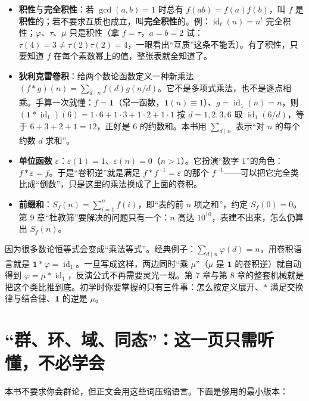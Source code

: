\documentclass[UTF8,a4paper,11pt,twoside,openright,fontset=fandol]{ctexbook}
\theoremstyle{definition}
\newcommand{\eps}{\varepsilon}
\newcommand{\one}{\mathbf 1}
\newcommand{\id}{\operatorname{id}}
\begin{document}
\begin{itemize}
\item \textbf{积性}与\textbf{完全积性}：若 $\gcd(a,b)=1$ 时总有 $f(ab)=f(a)f(b)$，叫 $f$ 是\textbf{积性}的；若不要求互质也成立，叫\textbf{完全积性}的。例：$\id_t(n)=n^t$ 完全积性；$\varphi$、$\tau$、$\mu$ 只是积性（拿 $f=\tau$，$a=b=2$ 试：$\tau(4)=3\ne\tau(2)\tau(2)=4$，一眼看出“互质”这条不能丢）。有了积性，只要知道 $f$ 在每个素数幂上的值，整张表就全知道了。
\item \textbf{狄利克雷卷积}：给两个数论函数定义一种新乘法
$(f*g)(n)=\sum_{d\mid n}f(d)g(n/d)$。它不是多项式乘法，也不是逐点相乘。手算一次就懂：$f=\one$（常一函数，$\one(n)\equiv1$）、$g=\id_1(n)=n$，则 $(\one*\id_1)(6)=1\cdot6+1\cdot3+1\cdot2+1\cdot1$ 按 $d=1,2,3,6$ 取 $\id_1(6/d)$，等于 $6+3+2+1=12$，正好是 $6$ 的约数和。本书用 $\sum_{d\mid n}$ 表示“对 $n$ 的每个约数 $d$ 求和”。
\item \textbf{单位函数} $\eps$：$\eps(1)=1$、$\eps(n)=0$（$n>1$）。它扮演“数字 $1$”的角色：$f*\eps=f$。于是“卷积逆”就是满足 $f*f^{-1}=\eps$ 的那个 $f^{-1}$——可以把它完全类比成“倒数”，只是这里的乘法换成了上面的卷积。
\item \textbf{前缀和}：$S_f(n)=\sum_{i=1}^{n}f(i)$，即“表的前 $n$ 项之和”，约定 $S_f(0)=0$。第 9 章“杜教筛”要解决的问题只有一个：$n$ 高达 $10^{10}$，表建不出来，怎么仍算出 $S_f(n)$。
\end{itemize}

\begin{tip}
因为很多数论恒等式会变成“乘法等式”。经典例子：$\sum_{d\mid n}\varphi(d)=n$，用卷积语言就是 $\one*\varphi=\id_1$。一旦写成这样，两边同时“乘 $\mu$”（$\mu$ 是 $\one$ 的卷积逆）就自动得到 $\varphi=\mu*\id_1$，反演公式不再需要灵光一现。第 7 章与第 8 章的整套机械就是把这个类比推到底。初学时你要掌握的只有三件事：怎么按定义展开、$*$ 满足交换律与结合律、$\one$ 的逆是 $\mu$。
\end{tip}

\section{“群、环、域、同态”：这一页只需听懂，不必学会}
本书不要求你会群论，但正文会用这些词压缩语言。下面是够用的最小版本：
\end{document}

